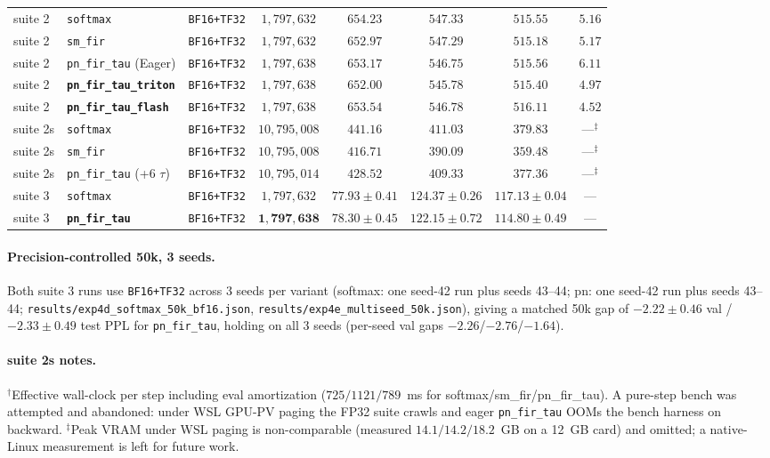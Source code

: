 \documentclass[11pt,a4paper]{article}
\begin{document}
\begin{table}[ht!]
\begin{tabular}{llcccccc}
\midrule
suite 2 & \texttt{softmax} & \texttt{BF16+TF32} & $1,797,632$ & $654.23$ & $547.33$ & $515.55$ & $5.16$ \\
suite 2 & \texttt{sm\_fir} & \texttt{BF16+TF32} & $1,797,632$ & $652.97$ & $547.29$ & $515.18$ & $5.17$ \\
suite 2 & \texttt{pn\_fir\_tau} (Eager) & \texttt{BF16+TF32} & $1,797,638$ & $653.17$ & $546.75$ & $515.56$ & $6.11$ \\
suite 2 & \textbf{\texttt{pn\_fir\_tau\_triton}} & \texttt{BF16+TF32} & $1,797,638$ & $652.00$ & $545.78$ & $515.40$ & $\mathbf{4.97}$ \\
suite 2 & \textbf{\texttt{pn\_fir\_tau\_flash}} & \texttt{BF16+TF32} & $1,797,638$ & $653.54$ & $546.78$ & $516.11$ & $\mathbf{4.52}$ \\
suite 2s & \texttt{softmax} & \texttt{BF16+TF32} & $10,795,008$ & $441.16$ & $411.03$ & $379.83$ & ---$^\ddagger$ \\
suite 2s & \texttt{sm\_fir} & \texttt{BF16+TF32} & $10,795,008$ & $416.71$ & $390.09$ & $359.48$ & ---$^\ddagger$ \\
suite 2s & \texttt{pn\_fir\_tau} (+6 $\tau$) & \texttt{BF16+TF32} & $10,795,014$ & $428.52$ & $409.33$ & $377.36$ & ---$^\ddagger$ \\
suite 3 & \texttt{softmax} & \texttt{BF16+TF32} & $1,797,632$ & $77.93 \pm 0.41$ & $124.37 \pm 0.26$ & $117.13 \pm 0.04$ & --- \\
suite 3 & \textbf{\texttt{pn\_fir\_tau}} & \texttt{BF16+TF32} & $\mathbf{1,797,638}$ & $78.30 \pm 0.45$ & $\mathbf{122.15 \pm 0.72}$ & $\mathbf{114.80 \pm 0.49}$ & --- \\
\bottomrule
\end{tabular}
\paragraph*{Precision-controlled 50k, 3 seeds.} Both suite 3 runs use \texttt{BF16+TF32} across 3 seeds per variant (softmax: one seed-42 run plus seeds 43--44; pn: one seed-42 run plus seeds 43--44; \texttt{results/exp4d\_softmax\_50k\_bf16.json}, \texttt{results/exp4e\_multiseed\_50k.json}), giving a matched 50k gap of $-2.22 \pm 0.46$ val / $-2.33 \pm 0.49$ test PPL for \texttt{pn\_fir\_tau}, holding on all 3 seeds (per-seed val gaps $-2.26$/$-2.76$/$-1.64$).

\paragraph*{suite 2s notes.} $^\dagger$Effective wall-clock per step including eval amortization ($725/1121/789$~ms for softmax/sm\_fir/pn\_fir\_tau). A pure-step bench was attempted and abandoned: under WSL GPU-PV paging the FP32 suite crawls and eager \texttt{pn\_fir\_tau} OOMs the bench harness on backward. $^\ddagger$Peak VRAM under WSL paging is non-comparable (measured $14.1/14.2/18.2$~GB on a 12~GB card) and omitted; a native-Linux measurement is left for future work.


\end{table}
\end{document}
